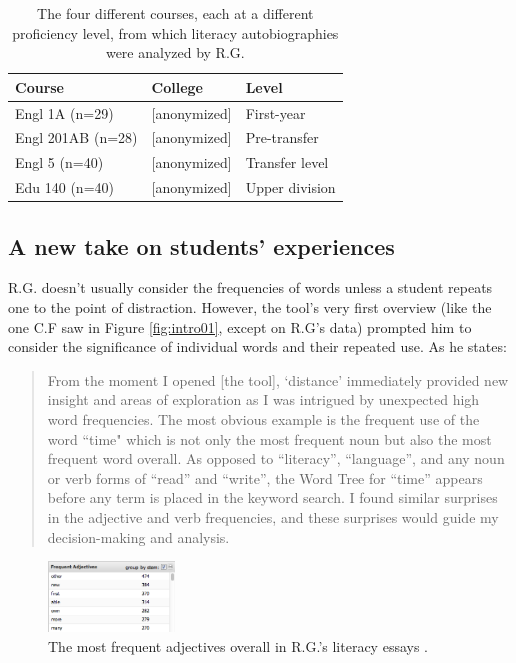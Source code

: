 \documentclass{sig-alternate}
\begin{document}
\begin{table}
\begin{tabular}{lll}
Course& College & Level \\
\hline
Engl 1A (n=29) & [anonymized] & First-year \\
Engl 201AB (n=28) & [anonymized] & Pre-transfer \\
Engl 5 (n=40) & [anonymized] & Transfer level \\
Edu 140 (n=40) & [anonymized] & Upper division \\
\end{tabular}
\caption{The four different courses, each at a different proficiency level, from which literacy autobiographies were analyzed by R.G. \label{table:rex-courses}}
\end{table}


 \subsection{A new take on students' experiences}

R.G. doesn't usually consider the frequencies of words unless a student repeats one to the point of distraction. However, the tool's very first overview (like the one C.F saw in Figure \ref{fig:intro01}, except on R.G's data) prompted him to consider the significance of individual words and their repeated use.  As he states:
\begin{quote}
From the moment I opened [the tool], `distance' immediately provided new insight and areas of exploration as I was intrigued by unexpected high word frequencies.  The most obvious example is the frequent use of the word ``time" which is not only the most frequent noun but also the most frequent word overall.  As opposed to ``literacy'', ``language'', and any noun or verb forms of ``read'' and ``write'', the Word Tree for ``time'' appears before any term is placed in the keyword search.   I found similar surprises in the adjective and verb frequencies, and these surprises would guide my decision-making and analysis.
\end{quote}

\begin{figure}
\begin{center}
\includegraphics[width=0.3\textwidth]{fig/rex/02.png}
\end{center}
\caption{The most frequent adjectives overall in R.G.'s literacy essays \label{fig:rex02}.}
\end{figure}
\end{document}
